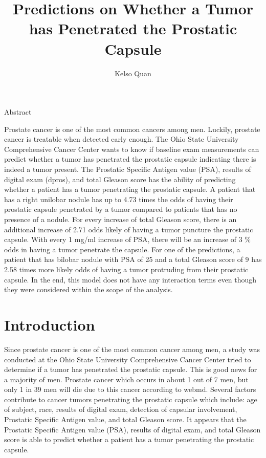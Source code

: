 \documentclass{article}\usepackage[]{graphicx}\usepackage[]{color}
\title{Predictions on Whether a Tumor has Penetrated the Prostatic Capsule}
\author{Kelso Quan}
\begin{document}
 

\maketitle
\begin{center}
\Large{Abstract}
\end{center}

Prostate cancer is one of the most common cancers among men. Luckily, prostate cancer is treatable when detected early enough. The Ohio State University Comprehensive Cancer Center wants to know if baseline exam measurements can predict whether a tumor has penetrated the prostatic capsule indicating there is indeed a tumor present. The Prostatic Specific Antigen value (PSA), results of digital exam (dpros), and total Gleason score has the ability of predicting whether a patient has a tumor penetrating the prostatic capsule. A patient that has a right unilobar nodule has up to 4.73 times the odds of having their prostatic capsule penetrated by a tumor compared to patients that has no presence of a nodule. For every increase of total Gleason score, there is an additional increase of 2.71 odds likely of having a tumor puncture the prostatic capsule. With every 1 mg/ml increase of PSA, there will be an increase of 3 \% odds in having a tumor penetrate the capsule. For one of the predictions, a patient that has bilobar nodule with PSA of 25 and a total Gleason score of 9 has 2.58 times more likely odds of having a tumor protruding from their prostatic capsule. In the end, this model does not have any interaction terms even though they were considered within the scope of the analysis. 

\section{Introduction}
\qquad Since prostate cancer is one of the most common cancer among men, a study was conducted at the Ohio State University Comprehensive Cancer Center tried to determine if a tumor has penetrated the prostatic capsule. This is good news for a majority of men. Prostate cancer which occurs in about 1 out of 7 men, but only 1 in 39 men will die due to this cancer according to webmd. Several factors contribute to cancer tumors penetrating the prostatic capsule which include: age of subject, race, results of digital exam, detection of capsular involvement, Prostatic Specific Antigen value, and total Gleason score. It appears that the Prostatic Specific Antigen value (PSA), results of digital exam, and total Gleason score is able to predict whether a patient has a tumor penetrating the prostatic capsule. 
\end{document}
